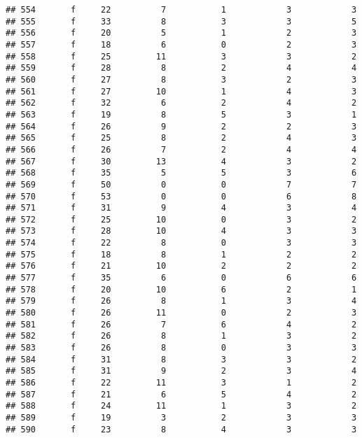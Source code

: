 \documentclass[
]{article}
\begin{document}
\begin{verbatim}
## 554       f     22          7           1            3            3
## 555       f     33          8           3            3            5
## 556       f     20          5           1            2            3
## 557       f     18          6           0            2            3
## 558       f     25         11           3            3            2
## 559       f     28          8           2            4            4
## 560       f     27          8           3            2            3
## 561       f     27         10           1            4            3
## 562       f     32          6           2            4            2
## 563       f     19          8           5            3            1
## 564       f     26          9           2            2            3
## 565       f     25          8           2            4            3
## 566       f     26          7           2            4            4
## 567       f     30         13           4            3            2
## 568       f     35          5           5            3            6
## 569       f     50          0           0            7            7
## 570       f     53          0           0            6            8
## 571       f     31          9           4            3            4
## 572       f     25         10           0            3            2
## 573       f     28         10           4            3            3
## 574       f     22          8           0            3            3
## 575       f     18          8           1            2            2
## 576       f     21         10           2            2            2
## 577       f     35          6           0            6            6
## 578       f     20         10           6            2            1
## 579       f     26          8           1            3            4
## 580       f     26         11           0            2            3
## 581       f     26          7           6            4            2
## 582       f     26          8           1            3            2
## 583       f     26          8           0            3            3
## 584       f     31          8           3            3            2
## 585       f     31          9           2            3            4
## 586       f     22         11           3            1            2
## 587       f     21          6           5            4            2
## 588       f     24         11           1            3            2
## 589       f     19          3           2            3            3
## 590       f     23          8           4            3            3

\end{verbatim}
\end{document}
